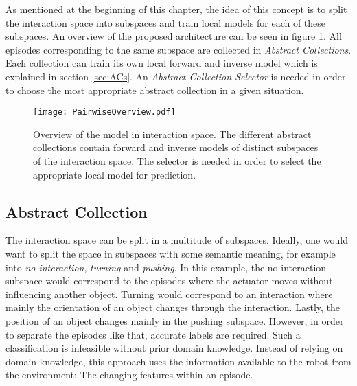 As mentioned at the beginning of this chapter, the idea of this concept is to split the interaction space into subspaces and train local models for each of these subspaces. 
An overview of the proposed architecture can be seen in figure \ref{fig:PairOverview}.
All episodes corresponding to the same subspace are collected in \textit{Abstract Collections}. Each collection can train its own local forward and inverse model which is explained in section \ref{sec:ACs}.
An \textit{Abstract Collection Selector} is needed in order to choose the most appropriate abstract collection in a given situation. 


\begin{figure}
	\centering
	\texttt{[image: PairwiseOverview.pdf]}
	\caption{Overview of the model in interaction space. The different abstract collections contain forward and inverse models of distinct subspaces of the interaction space. The selector is needed in order to select the appropriate local model for prediction.}
	\label{fig:PairOverview}
\end{figure}

\subsection{Abstract Collection \label{sec:ACs}}

The interaction space can be split in a multitude of subspaces. Ideally, one would want to split the space in subspaces with some semantic meaning, for example into \textit{no interaction}, \textit{turning} and \textit{pushing}. In this example, the no interaction subspace would correspond to the episodes where the actuator moves without influencing another object. Turning would correspond to an interaction where mainly the orientation of an object changes through the interaction. Lastly, the position of an object changes mainly in the pushing subspace. However, in order to separate the episodes like that, accurate labels are required. Such a classification is infeasible without prior domain knowledge. 
Instead of relying on domain knowledge, this approach uses the information available to the robot from the environment: The changing features within an episode.

